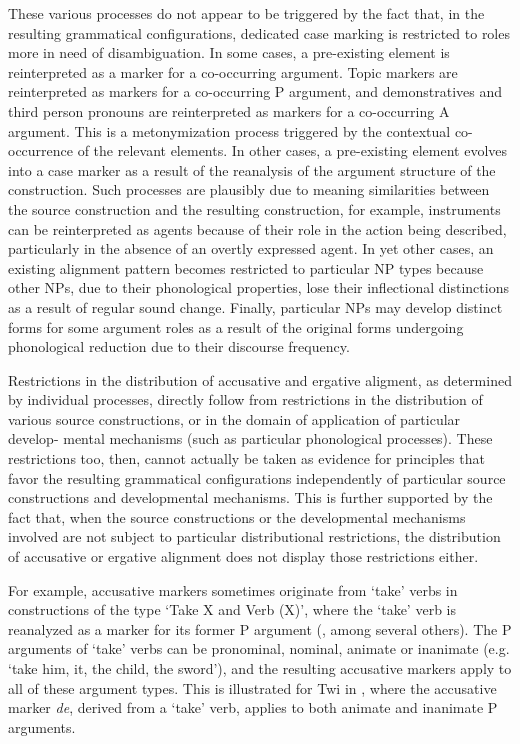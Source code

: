 \documentclass[output=paper]{langsci/langscibook}
\begin{document}
These various processes do not appear to be triggered by the fact
that, in the resulting grammatical configurations, dedicated case marking is
restricted to roles more in need of disambiguation. 
In some cases, a
pre-existing element  is reinterpreted as a
marker for a co-occurring argument. Topic markers
are reinterpreted as markers for a co-occurring P argument, and
demonstratives and third person pronouns are reinterpreted as markers
for a co-occurring A argument.  This is a metonymization process triggered by the
  contextual co-occurrence of the relevant elements. In other cases,
  a pre-existing element evolves into a case marker  as a
  result of the reanalysis of the argument structure of the
  construction. Such processes are plausibly due to meaning
  similarities between the source construction and the resulting
  construction, for example, instruments can be reinterpreted as
  agents  because of their role in the action being described,
  particularly in the absence of an overtly expressed
  agent. 
 In yet other cases, an existing alignment pattern becomes restricted to
particular NP types because other NPs, due to their phonological
properties, lose their inflectional distinctions as a result of
regular sound change. Finally, particular NPs may develop distinct forms
for some argument roles as a result of the original forms undergoing
phonological reduction due to their discourse frequency. 

Restrictions in the distribution of accusative and ergative aligment,
as determined by individual processes, directly follow from  restrictions in the distribution of
various source constructions, or in the domain of application of particular develop-
mental mechanisms (such as particular phonological processes). These restrictions too, then, cannot actually
be taken as evidence  for principles that favor the resulting
grammatical configurations independently of particular source
constructions and developmental mechanisms. This is further
supported by the fact that, when the source constructions or the
developmental mechanisms involved are not subject to particular
distributional restrictions, the distribution of accusative or
ergative alignment does not display those restrictions either.

For example, accusative
markers sometimes originate from  `take' verbs in constructions of the type `Take
X and Verb (X)', where the `take' verb is reanalyzed as a marker
for its former
       P argument (\citealt{Lord1993,Chappell2013}, among
         several others). The P arguments of `take' verbs can be pronominal, nominal, animate or inanimate (e.g. `take him, it, the child, the sword'), 
and the resulting accusative markers apply to all of these
argument types. This is illustrated for Twi 
in 
 ,
where the accusative marker {\em de},
         derived from a `take' verb, applies to both animate and inanimate P arguments.
\end{document}
